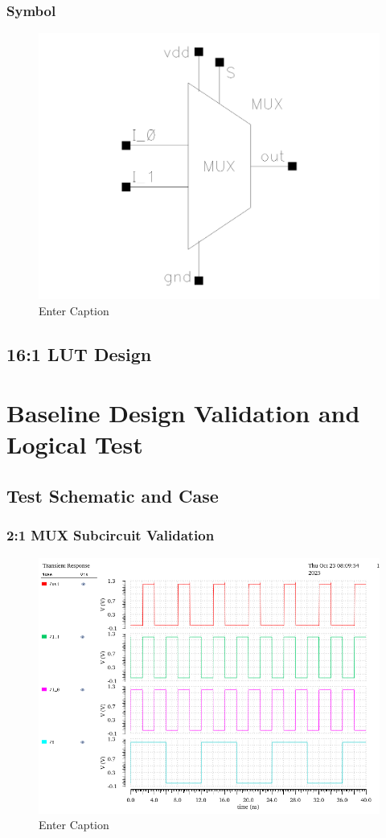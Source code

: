 \documentclass[12pt]{article}
\begin{document}
\subsubsection*{Symbol}

\begin{figure}[H]
    \centering
    \includegraphics[width=0.5\linewidth]{writeup//figures/MUX_sym.png}
    \caption{Enter Caption}
\end{figure}

\newpage

\subsection{16:1 LUT Design}



\newpage

\section{Baseline Design Validation and Logical Test}
\subsection{Test Schematic and Case}
\subsubsection*{2:1 MUX Subcircuit Validation}
\begin{figure}[H]
    \centering
    \includegraphics[width=0.5\linewidth]{writeup//figures/muxsubval.png}
    \caption{Enter Caption}
\end{figure}
\end{document}
